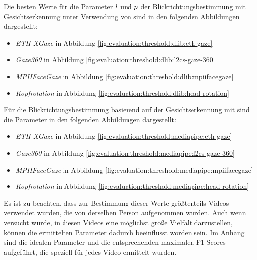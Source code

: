 Die besten Werte für die Parameter $l$ und $p$ der Blickrichtungsbestimmung mit Gesichtserkennung unter Verwendung von \dlib sind in den folgenden Abbildungen dargestellt:

\begin{itemize}
    \item  \textit{ETH-XGaze} in Abbildung  \ref{fig:evaluation:threshold:dlib:eth-gaze}
    \item  \textit{Gaze360} in Abbildung 
 \ref{fig:evaluation:threshold:dlib:l2cs-gaze-360}
    \item  \textit{MPIIFaceGaze} in Abbildung \ref{fig:evaluation:threshold:dlib:mpiifacegaze}
    \item  \textit{Kopfrotation} in Abbildung 
 \ref{fig:evaluation:threshold:dlib:head-rotation}
\end{itemize}

Für die Blickrichtungsbestimmung basierend auf der Gesichtserkennung mit \mediapipe sind die Parameter in den folgenden Abbildungen dargestellt:

\begin{itemize}
    \item  \textit{ETH-XGaze} in Abbildung \ref{fig:evaluation:threshold:mediapipe:eth-gaze}
    \item  \textit{Gaze360} in Abbildung \ref{fig:evaluation:threshold:mediapipe:l2cs-gaze-360}
    \item  \textit{MPIIFaceGaze} in Abbildung \ref{fig:evaluation:threshold:mediapipe:mpiifacegaze}
    \item  \textit{Kopfrotation} in Abbildung \ref{fig:evaluation:threshold:mediapipe:head-rotation}
\end{itemize}

Es ist zu beachten, dass zur Bestimmung dieser Werte größtenteils Videos verwendet wurden, die von derselben Person aufgenommen wurden. Auch wenn versucht wurde, in diesen Videos eine möglichst große Vielfalt darzustellen, können die ermittelten Parameter dadurch beeinflusst worden sein. Im Anhang sind die idealen Parameter und die entsprechenden maximalen F1-Scores aufgeführt, die speziell für jedes Video ermittelt wurden. 

